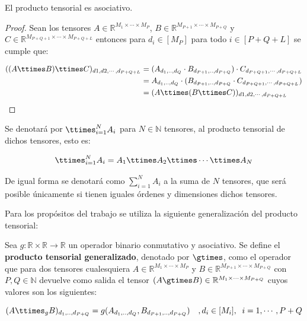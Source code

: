\begin{prop} \label{prop:prodtensasociativo}
El producto tensorial es asociativo.
\end{prop}
\begin{proof}
Sean los tensores $A\in\mathbb{R}^{M_1\times\cdots \times M_P}$, $B\in\mathbb{R}^{M_{P+1}\times\cdots \times M_{P+Q}}$ y $C\in\mathbb{R}^{M_{P+Q+1}\times\cdots \times M_{P+Q+L}}$ entonces para $d_i\in[M_P]$ para todo $i\in[P+Q+L]$ se cumple que:

\begin{align*}
((A\ttimes B)\ttimes C)_{d1,d2,\cdots ,d_{P+Q+L}} &= (A_{d_1,..,d_Q} \cdot B_{d_{P+1},..,d_{P+Q}}) \cdot C_{d_{P+Q+1},\cdots ,d_{P+Q+L}} \\ 
	&= A_{d_1,..,d_Q} \cdot (B_{d_{P+1},..,d_{P+Q}} \cdot C_{d_{P+Q+1},\cdots ,d_{P+Q+L}}) \\
	&= (A\ttimes (B\ttimes C))_{d1,d2,\cdots ,d_{P+Q+L}}
\end{align*}
\end{proof}

Se denotará por $\ttimes_{i=1}^{N} A_i$ para $N\in \mathbb{N}$ tensores, al producto tensorial de dichos tensores, esto es:

$$
\ttimes_{i=1}^{N} A_i = A_1 \ttimes A_2 \ttimes \cdots  \ttimes A_N
$$

De igual forma se denotará como $\sum_{i=1}^{N} A_i$ a la suma de $N$ tensores, que será posible únicamente si tienen iguales órdenes y dimensiones dichos tensores.

Para los propósitos del trabajo se utiliza la siguiente generalización del producto tensorial:

\begin{definicion} \label{def:factorizacionGeneralizada}
Sea $g:\mathbb{R}\times\mathbb{R}\rightarrow\mathbb{R}$ un operador binario conmutativo y asociativo. Se define el \textbf{producto tensorial generalizado}, denotado por $\gtimes$, como el operador que para dos tensores cualesquiera $A\in\mathbb{R}^{M_1\times\cdots \times M_P}$ y $B\in\mathbb{R}^{M_{P+1}\times\cdots \times M_{P+Q}}$ con $P,Q\in\mathbb{N}$ devuelve como salida el tensor $(A\gtimes B) \in\mathbb{R}^{M_1\times\cdots \times M_{P+Q}}$ cuyos valores son los siguientes:

\begin{equation}
(A\ttimes_g B)_{d_1,..,d_{P+Q}} = g(A_{d_1,..,d_Q},B_{d_{P+1},..,d_{P+Q}})\quad, d_i\in[M_i], \;\; i=1,\cdots ,P+Q
\end{equation}

\end{definicion}

